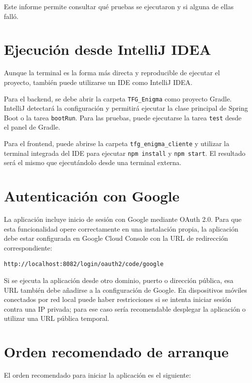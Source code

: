 Este informe permite consultar qué pruebas se ejecutaron y si alguna de ellas falló.

\section{Ejecución desde IntelliJ IDEA}

Aunque la terminal es la forma más directa y reproducible de ejecutar el proyecto, también puede utilizarse un IDE como IntelliJ IDEA.

Para el backend, se debe abrir la carpeta \texttt{TFG\_Enigma} como proyecto Gradle. IntelliJ detectará la configuración y permitirá ejecutar la clase principal de Spring Boot o la tarea \texttt{bootRun}. Para las pruebas, puede ejecutarse la tarea \texttt{test} desde el panel de Gradle.

Para el frontend, puede abrirse la carpeta \texttt{tfg\_enigma\_cliente} y utilizar la terminal integrada del IDE para ejecutar \texttt{npm install} y \texttt{npm start}. El resultado será el mismo que ejecutándolo desde una terminal externa.

\section{Autenticación con Google}

La aplicación incluye inicio de sesión con Google mediante OAuth 2.0. Para que esta funcionalidad opere correctamente en una instalación propia, la aplicación debe estar configurada en Google Cloud Console con la URL de redirección correspondiente:

\begin{lstlisting}
http://localhost:8082/login/oauth2/code/google
\end{lstlisting}

Si se ejecuta la aplicación desde otro dominio, puerto o dirección pública, esa URL también debe añadirse a la configuración de Google. En dispositivos móviles conectados por red local puede haber restricciones si se intenta iniciar sesión contra una IP privada; para ese caso sería recomendable desplegar la aplicación o utilizar una URL pública temporal.

\section{Orden recomendado de arranque}

El orden recomendado para iniciar la aplicación es el siguiente:

